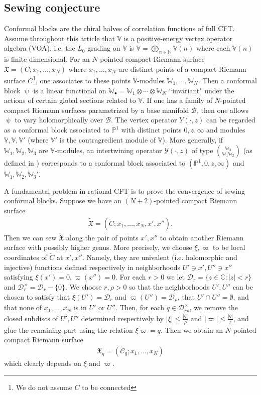\documentclass[12pt,a4paper,notitlepage]{article}
\theoremstyle{definition}
\theoremstyle{plain}
\newcommand{\fk}{\mathfrak}
\newcommand{\mc}{\mathcal}
\newcommand{\wtd}{\widetilde}
\newcommand{\blt}{\bullet}
\newcommand{\Vbb}{\mathbb V}
\newcommand{\Wbb}{\mathbb W}
\newcommand{\Cbb}{\mathbb C}
\newcommand{\Nbb}{\mathbb N}
\newcommand{\Pbb}{\mathbb P}
\numberwithin{equation}{section}
\begin{document}
\subsection*{Sewing conjecture}



Conformal blocks are the chiral halves of correlation functions of full CFT. Assume throughout this article that $\Vbb$ is a positive-energy vertex operator algebra (VOA), i.e. the $L_0$-grading on $\Vbb$ is $\Vbb=\bigoplus_{n\in\Nbb}\Vbb(n)$ where each $\Vbb(n)$ is finite-dimensional. For an $N$-pointed  compact Riemann surface $\fk X=(C;x_1,\dots,x_N)$ where  $x_1,\dots,x_N$ are distinct points of a compact Riemann surface $C$\footnote{We do not assume $C$ to be connected},  one associates to these points $\Vbb$-modules $\Wbb_1,\dots,\Wbb_N$. Then a conformal block $\uppsi$ is a  linear functional on $\Wbb_\blt=\Wbb_1\otimes\cdots\otimes\Wbb_N$ ``invariant" under the actions of certain global sections  related to $\Vbb$. If one has a family of $N$-pointed compact Riemann surfaces parametrized by a base manifold $\mc B$, then one allows $\uppsi$ to vary holomorphically over $\mc B$. The vertex operator $Y(\cdot,z)$ can be regarded as a conformal block associated to $\Pbb^1$ with distinct points $0,z,\infty$ and modules $\Vbb,\Vbb,\Vbb'$ (where $\Vbb'$ is the contragredient module of $\Vbb$). More generally, if $\Wbb_1,\Wbb_2,\Wbb_3$ are $\Vbb$-modules, an intertwining operator $\mc Y(\cdot,z)$ of type $\Wbb_3\choose\Wbb_1\Wbb_2$ (as defined in \cite{FHL93}) corresponds to a conformal block associated to $(\Pbb^1,0,z,\infty)$ and $\Wbb_1,\Wbb_2,\Wbb_3'$.

A fundamental problem in rational CFT is to prove the convergence of sewing conformal blocks.  Suppose  we have an $(N+2)$-pointed compact Riemann surface
\begin{align*}
\wtd{\fk X}=(\wtd C;x_1,\dots,x_N,x',x'').
\end{align*}
Then we can sew $\wtd{\fk X}$ along the pair of points $x',x''$ to obtain another Riemann surface with possibly higher genus. More precisely, we choose $\xi,\varpi$ to be local coordinates of $\wtd C$ at $x',x''$. Namely, they are univalent  (i.e. holomorphic and injective) functions defined respectively in neighborhoods $U'\ni x',U''\ni x''$ satisfying $\xi(x')=0,\varpi(x'')=0$. For each $r>0$ we let $\mc D_r=\{z\in\Cbb:|z|<r\}$ and $\mc D_r^\times=\mc D_r-\{0\}$. We choose $r,\rho>0$ so that the neighborhoods $U',U''$ can be chosen to satisfy that $\xi(U')=\mc D_r$ and $\varpi(U'')=\mc D_\rho$, that  $U'\cap U''=\emptyset$, and that none of $x_1,\dots,x_N$ is in $U'$ or $U''$. Then, for each $q\in\mc D_{r\rho}^\times$, we remove the closed subdiscs of $U',U''$ determined respectively by $|\xi|\leq \frac {|q|}\rho$ and $|\varpi|\leq \frac{|q|}r$, and glue the remaining part using the relation $\xi\varpi=q$. Then we obtain an $N$-pointed compact Riemann surface
\begin{align*}
\fk X_q=(\mc C_q;x_1,\dots,x_N)
\end{align*}
which clearly depends on $\xi$ and $\varpi$.
\end{document}
